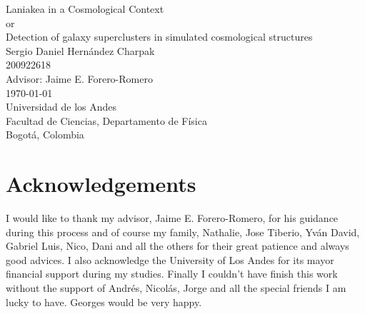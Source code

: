 \documentclass[12pt]{article}
\begin{document}
\begin{center}
\begin{figure}
\centering%
%
\end{figure}
\vspace{3 cm}
\FloatBarrier
\Huge
Laniakea in a Cosmological Context\\
\vspace{3 mm}
or\\
\vspace{3 mm}
Detection of galaxy superclusters in simulated cosmological structures\\  
\vspace{1 cm}
\vspace{3mm}
\Large Sergio Daniel Hern\'{a}ndez Charpak\\

\large
200922618\\
\vspace{1 cm}
\vspace{2mm}
\Large
Advisor: Jaime E. Forero-Romero\\

\normalsize
\vspace{2mm}
\vspace{1 cm}
\today \\
\vspace{1 cm}
\small 
Universidad de los Andes\\
Facultad de Ciencias, Departamento de F\'{i}sica\\
Bogot\'{a}, Colombia\\
\end{center}


\normalsize
\newpage
\section{Acknowledgements}

I would like to thank my advisor, Jaime E. Forero-Romero, for his guidance
 during this process and of course my family,
  Nathalie, Jose Tiberio, Yv\'{a}n David,
  Gabriel Luis, Nico, Dani and all the others for
   their great patience and always good advices. I
    also acknowledge the University of Los Andes
     for its mayor financial support during my
      studies. Finally I couldn't have finish this
       work without the support of Andr\'{e}s,
        Nicol\'{a}s, Jorge and all the special
         friends I am lucky to have. Georges would
          be very happy.


\newpage
\end{document}
